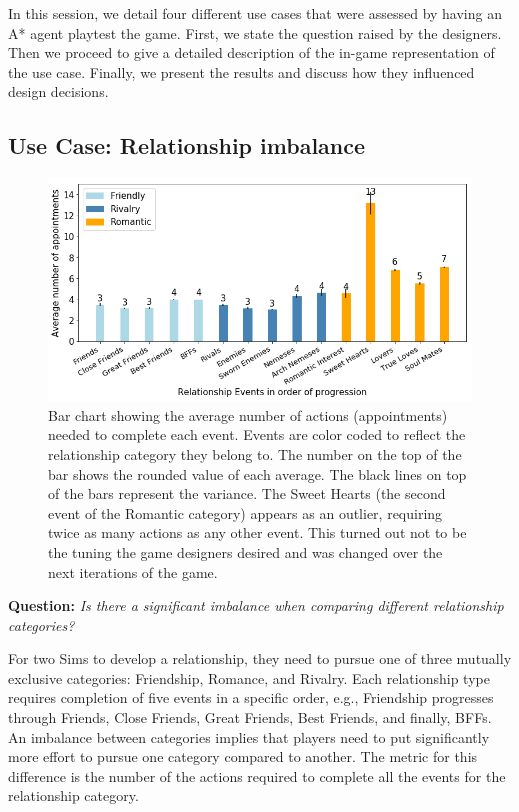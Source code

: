 \documentclass[letterpaper]{article} %
\begin{document}
In this session, we detail four different use cases that were assessed by having an A* agent playtest the game. First, we state the question raised by the designers. Then we proceed to give a detailed description of the in-game representation of the use case. Finally, we present the results and discuss how they influenced design decisions.

\subsection{Use Case: Relationship imbalance}

\begin{figure}[th]
  \centering
  \includegraphics[width=1.0\linewidth]{images/relationship_viz.png}
  \caption{Bar chart showing the average number of actions (appointments) needed to complete each event. Events are color coded to reflect the relationship category they belong to. The number on the top of the bar shows the rounded value of each average. The black lines on top of the bars represent the variance. The Sweet Hearts (the second event of the Romantic category) appears as an outlier, requiring twice as many actions as any other event. This turned out not to be the tuning the game designers desired and was changed over the next iterations of the game.}
  \label{Figure:bar_char_relationships}
\end{figure}

\textbf{Question:} {\em Is there a significant imbalance when comparing different relationship categories?}

For two Sims to develop a relationship, they need to pursue one of three mutually exclusive categories: Friendship, Romance, and Rivalry. Each relationship type requires completion of five events in a specific order, e.g., Friendship progresses through Friends, Close Friends, Great Friends, Best Friends, and finally, BFFs. An imbalance between categories implies that players need to put significantly more effort to pursue one category compared to another. The metric for this difference is the number of the actions required to complete all the events for the relationship category.
\end{document}
